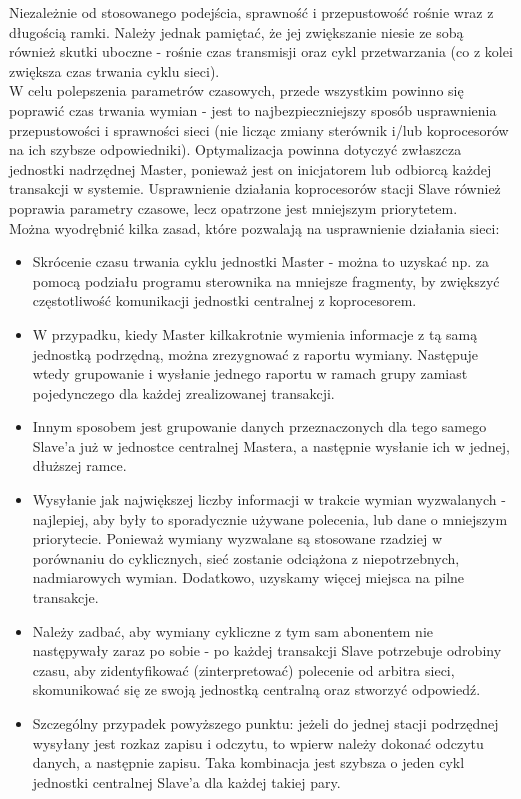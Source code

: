 \documentclass[a4paper,twoside]{article}
\begin{document}
	Niezależnie od stosowanego podejścia, sprawność i przepustowość rośnie wraz z długością ramki. Należy jednak pamiętać, że jej zwiększanie niesie ze sobą również skutki uboczne - rośnie czas transmisji oraz cykl przetwarzania (co z kolei zwiększa czas trwania cyklu sieci). \\
	W celu polepszenia parametrów czasowych, przede wszystkim powinno się poprawić czas trwania wymian - jest to najbezpieczniejszy sposób usprawnienia przepustowości i sprawności sieci (nie licząc zmiany sterównik i/lub koprocesorów na ich szybsze odpowiedniki). Optymalizacja powinna dotyczyć zwłaszcza jednostki nadrzędnej Master, ponieważ jest on inicjatorem lub odbiorcą każdej transakcji w systemie. Usprawnienie działania koprocesorów stacji Slave również poprawia parametry czasowe, lecz opatrzone jest mniejszym priorytetem. \\
	Można wyodrębnić kilka zasad, które pozwalają na usprawnienie działania sieci:
	\begin{itemize}
		\item Skrócenie czasu trwania cyklu jednostki Master - można to uzyskać np. za pomocą podziału programu sterownika na mniejsze fragmenty, by zwiększyć częstotliwość komunikacji jednostki centralnej z koprocesorem.
		\item W przypadku, kiedy Master kilkakrotnie wymienia informacje z tą samą jednostką podrzędną, można zrezygnować z raportu wymiany. Następuje wtedy grupowanie i wysłanie jednego raportu w ramach grupy zamiast pojedynczego dla każdej zrealizowanej transakcji.
		\item Innym sposobem jest grupowanie danych przeznaczonych dla tego samego Slave'a już w jednostce centralnej Mastera, a następnie wysłanie ich w jednej, dłuższej ramce.
		\item Wysyłanie jak największej liczby informacji w trakcie wymian wyzwalanych - najlepiej, aby były to sporadycznie używane polecenia, lub dane o mniejszym priorytecie. Ponieważ wymiany wyzwalane są stosowane rzadziej w porównaniu do cyklicznych, sieć zostanie odciążona z niepotrzebnych, nadmiarowych wymian. Dodatkowo, uzyskamy więcej miejsca na pilne transakcje.
		\item Należy zadbać, aby wymiany cykliczne z tym sam abonentem nie następywały zaraz po sobie - po każdej transakcji Slave potrzebuje odrobiny czasu, aby zidentyfikować (zinterpretować) polecenie od arbitra sieci, skomunikować się ze swoją jednostką centralną oraz stworzyć odpowiedź.
		\item Szczególny przypadek powyższego punktu: jeżeli do jednej stacji podrzędnej wysyłany jest rozkaz zapisu i odczytu, to wpierw należy dokonać odczytu danych, a następnie zapisu. Taka kombinacja jest szybsza o jeden cykl jednostki centralnej Slave'a dla każdej takiej pary.
	\end{itemize}
\end{document}
